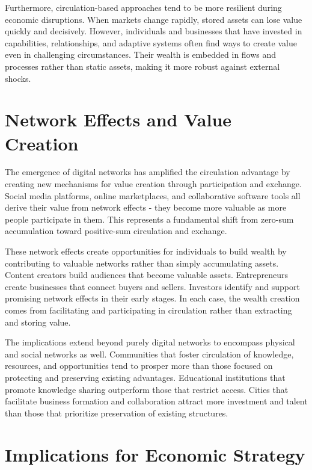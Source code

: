 \documentclass[
  Letterpaper,
]{scrbook}
\begin{document}
Furthermore, circulation-based approaches tend to be more resilient
during economic disruptions. When markets change rapidly, stored assets
can lose value quickly and decisively. However, individuals and
businesses that have invested in capabilities, relationships, and
adaptive systems often find ways to create value even in challenging
circumstances. Their wealth is embedded in flows and processes rather
than static assets, making it more robust against external shocks.

\section{Network Effects and Value
Creation}\label{network-effects-and-value-creation}

The emergence of digital networks has amplified the circulation
advantage by creating new mechanisms for value creation through
participation and exchange. Social media platforms, online marketplaces,
and collaborative software tools all derive their value from network
effects - they become more valuable as more people participate in them.
This represents a fundamental shift from zero-sum accumulation toward
positive-sum circulation and exchange.

These network effects create opportunities for individuals to build
wealth by contributing to valuable networks rather than simply
accumulating assets. Content creators build audiences that become
valuable assets. Entrepreneurs create businesses that connect buyers and
sellers. Investors identify and support promising network effects in
their early stages. In each case, the wealth creation comes from
facilitating and participating in circulation rather than extracting and
storing value.

The implications extend beyond purely digital networks to encompass
physical and social networks as well. Communities that foster
circulation of knowledge, resources, and opportunities tend to prosper
more than those focused on protecting and preserving existing
advantages. Educational institutions that promote knowledge sharing
outperform those that restrict access. Cities that facilitate business
formation and collaboration attract more investment and talent than
those that prioritize preservation of existing structures.

\section{Implications for Economic
Strategy}\label{implications-for-economic-strategy}
\end{document}
